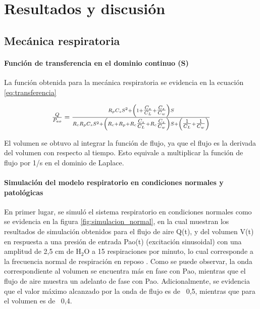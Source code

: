 \documentclass[journal]{IEEEtran}
\begin{document}
\section{Resultados y discusión}

\subsection{\textbf{Mecánica respiratoria}}
\paragraph{\textbf{Función de transferencia en el dominio continuo (S)}}
La función obtenida para la mecánica respiratoria se evidencia en la ecuación \ref{eq:transferencia}

\begin{equation}
\scalebox{0.98}{$\frac{Q}{P_{ao}} = 
\frac{R_p C_s S^2 + \left(1 + \tfrac{C_s}{C_L} + \tfrac{C_s}{C_w}\right)S}
{R_c R_p C_s S^2
+ \left(R_c + R_p + R_c\tfrac{C_s}{C_L} + R_c\tfrac{C_s}{C_w}\right)S
+ \left(\tfrac{1}{C_L} + \tfrac{1}{C_w}\right)}$}
\label{eq:transferencia}
\end{equation}

El volumen se obtuvo al integrar la función de flujo, ya que el flujo es la derivada del volumen con respecto al tiempo. Esto equivale a multiplicar la función de flujo por 1/s en el dominio de Laplace.\bigskip

\paragraph{\textbf{Simulación del modelo respiratorio en condiciones normales y patológicas}}

En primer lugar, se simuló el sistema respiratorio en condiciones normales como se evidencia en la figura \ref{fig:simulacion_normal}, en la cual muestran los resultados de simulación obtenidos para el flujo de aire Q(t), y del volumen V(t) en respuesta a una presión de entrada Pao(t) (excitación sinusoidal) con una amplitud de 2,5 cm de H$_2$O a 15 respiraciones por minuto, lo cual corresponde a la frecuencia normal de respiración en reposo \cite{khoo2000physiological}. Como se puede observar, la onda correspondiente al volumen se encuentra más en fase con Pao, mientras que el flujo de aire muestra un adelanto de fase con Pao. Adicionalmente, se evidencia que el valor máximo alcanzado por la onda de flujo es de ~0,5, mientras que para el volumen es de ~0,4.
\end{document}
